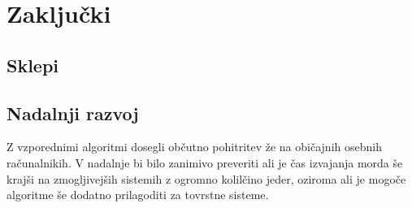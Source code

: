 \documentclass[a4paper,12pt,openright]{book}
\begin{document}
\chapter{Zaključki}

\section{Sklepi}

\section{Nadalnji razvoj}

Z vzporednimi algoritmi dosegli občutno pohitritev že na običajnih osebnih računalnikih. V nadalnje bi bilo zanimivo preveriti ali je čas izvajanja morda še krajši na zmogljivejših sistemih z ogromno kolilčino jeder, oziroma ali je mogoče algoritme še dodatno prilagoditi za tovrstne sisteme. 



\raggedright




\printbibliography[heading=bibintoc,title={Literatura}]
\end{document}

